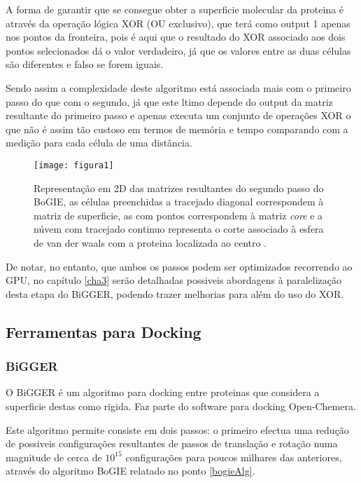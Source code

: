  A forma de garantir que se consegue obter a superficie molecular da proteina é através da operação lógica XOR (OU exclusivo), que terá como output 1 apenas nos pontos da fronteira, pois é aqui que o resultado do XOR associado aos dois pontos selecionados dá o valor verdadeiro, já que os valores entre as duas células são diferentes e falso se forem iguais.
 
Sendo assim a complexidade deste algoritmo está associada mais com o primeiro passo do que com o segundo, já que este ltimo depende do output da matriz resultante do primeiro passo e apenas executa um conjunto de operações XOR o que não é assim tão custoso em termos de memória e tempo comparando com a medição para cada célula de uma distância.

\begin{figure}[ht]
  \centering
    {\texttt{[image: figura1]}}
  \caption{Representação em 2D das matrizes resultantes do segundo passo do BoGIE, as células preenchidas a tracejado diagonal correspondem à matriz de superficie, as com pontos correspondem à matriz \textit{core} e a núvem com tracejado continuo representa o corte associado à esfera de van der waals com a proteina localizada ao centro \cite{biggerPaper}.}
  \label{fig:fig2subfig}
\end{figure}

De notar, no entanto, que ambos os passos podem ser optimizados recorrendo ao GPU, no capítulo \ref{cha3} serão detalhadas possiveis abordagens à paralelização desta etapa do BiGGER, podendo trazer melhorias para além do uso do XOR.
\subsection{Ferramentas para Docking}
\subsubsection{BiGGER}
\label{biggerAlg}
O BiGGER\cite{biggerPaper} é um algoritmo para docking entre proteinas que considera a superficie destas como rigida. Faz parte do software para docking Open-Chemera.

Este algoritmo permite consiste em dois passos: o primeiro efectua uma redução de possiveis configurações resultantes de passos de translação e rotação numa magnitude de cerca de $10^{15}$ configurações para poucos milhares das anteriores, através do algoritmo BoGIE relatado no ponto \ref{bogieAlg}.

